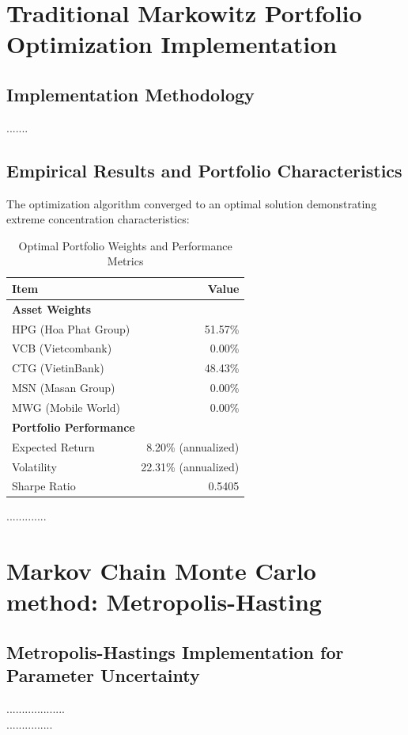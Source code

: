 \documentclass[12pt,a4paper,oneside]{book}
\theoremstyle{definition}
\begin{document}
\section{Traditional Markowitz Portfolio Optimization Implementation}

\subsection{Implementation Methodology}
.......

\subsection{Empirical Results and Portfolio Characteristics}

The optimization algorithm converged to an optimal solution demonstrating extreme concentration characteristics:

\begin{table}[H]
\centering
\caption{Optimal Portfolio Weights and Performance Metrics}
\begin{tabular}{l r}
\hline
\textbf{Item} & \textbf{Value} \\
\hline
\multicolumn{2}{l}{\textbf{Asset Weights}} \\
HPG (Hoa Phat Group)  & 51.57\% \\
VCB (Vietcombank)     & 0.00\%  \\
CTG (VietinBank)      & 48.43\% \\
MSN (Masan Group)     & 0.00\%  \\
MWG (Mobile World)    & 0.00\%  \\
\hline
\multicolumn{2}{l}{\textbf{Portfolio Performance}} \\
Expected Return       & 8.20\% (annualized) \\
Volatility            & 22.31\% (annualized) \\
Sharpe Ratio          & 0.5405 \\
\hline
\end{tabular}
\end{table}


.............


\newpage

\section{Markov Chain Monte Carlo method: Metropolis-Hasting}

\subsection{Metropolis-Hastings Implementation for Parameter Uncertainty}
...................\\
...............
\end{document}
